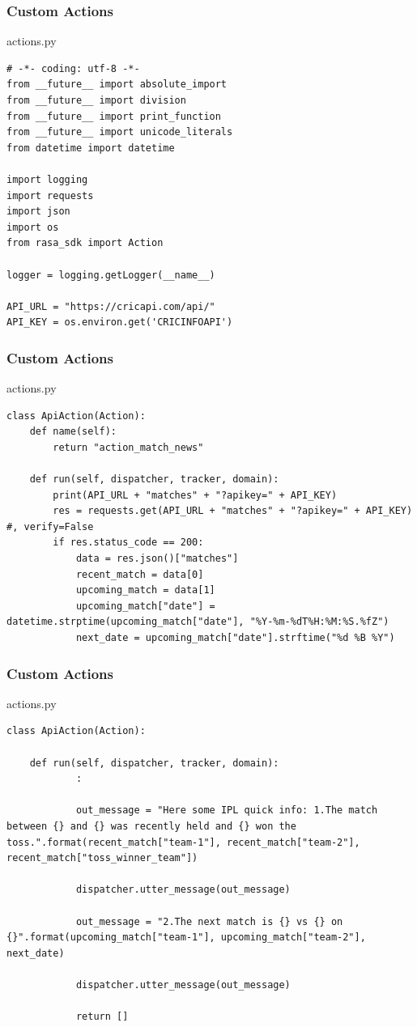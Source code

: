  \begin{frame}[fragile]\frametitle{Custom Actions}

 actions.py

\begin{lstlisting}
# -*- coding: utf-8 -*-
from __future__ import absolute_import
from __future__ import division
from __future__ import print_function
from __future__ import unicode_literals
from datetime import datetime

import logging
import requests
import json
import os
from rasa_sdk import Action

logger = logging.getLogger(__name__)

API_URL = "https://cricapi.com/api/"
API_KEY = os.environ.get('CRICINFOAPI')
\end{lstlisting}
\end{frame}

 \begin{frame}[fragile]\frametitle{Custom Actions}

actions.py

\begin{lstlisting}
class ApiAction(Action):
    def name(self):
        return "action_match_news"

    def run(self, dispatcher, tracker, domain):
        print(API_URL + "matches" + "?apikey=" + API_KEY)
        res = requests.get(API_URL + "matches" + "?apikey=" + API_KEY) #, verify=False
        if res.status_code == 200:
            data = res.json()["matches"]
            recent_match = data[0]
            upcoming_match = data[1]
            upcoming_match["date"] = datetime.strptime(upcoming_match["date"], "%Y-%m-%dT%H:%M:%S.%fZ")
            next_date = upcoming_match["date"].strftime("%d %B %Y")

\end{lstlisting}
\end{frame}

 \begin{frame}[fragile]\frametitle{Custom Actions}

actions.py

\begin{lstlisting}
class ApiAction(Action):

    def run(self, dispatcher, tracker, domain):
			:

            out_message = "Here some IPL quick info: 1.The match between {} and {} was recently held and {} won the toss.".format(recent_match["team-1"], recent_match["team-2"], recent_match["toss_winner_team"])

            dispatcher.utter_message(out_message)

            out_message = "2.The next match is {} vs {} on {}".format(upcoming_match["team-1"], upcoming_match["team-2"], next_date)

            dispatcher.utter_message(out_message)

            return []
\end{lstlisting}
\end{frame}

